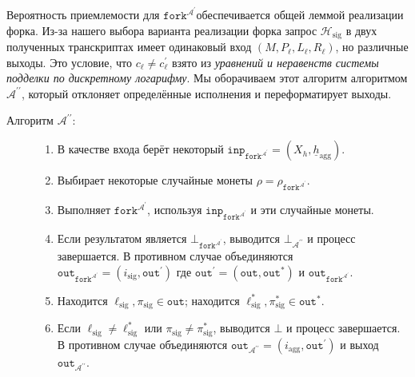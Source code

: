 \documentclass{mrl}
\theoremstyle{definition}
\numberwithin{theorem}{subsection}
\newcommand{\adversary}{\mathcal{A}}
\begin{document}
Вероятность приемлемости для $\texttt{fork}^{\adversary^\prime}$обеспечивается общей леммой реализации форка. Из-за нашего выбора варианта реализации форка запрос $\mathcal{H}_{\text{sig}}$ в двух полученных транскриптах имеет одинаковый вход $(M, P_\ell, L_\ell, R_\ell)$, но различные выходы. Это условие, что $c_\ell \neq c_\ell^{\prime}$ взято из \textit{уравнений и неравенств системы подделки по дискретному логарифму}. Мы оборачиваем этот алгоритм алгоритмом $\adversary^{\prime \prime}$, который отклоняет определённые исполнения и переформатирует выходы.

\begin{description}
\item [Алгоритм $\adversary^{\prime \prime}$:]

\begin{enumerate}
\item В качестве входа берёт некоторый $\texttt{inp}_{\texttt{fork}^{\adversary^\prime}} = (X_h, \underline{h}_{\text{agg}})$.

\item Выбирает некоторые случайные монеты $\rho = \rho_{\texttt{fork}^{\adversary^\prime}}$.

\item Выполняет $\texttt{fork}^{\adversary^\prime}$, используя $\texttt{inp}_{\texttt{fork}^{\adversary^\prime}}$ и эти случайные монеты.

\item Если результатом является $\bot_{\texttt{fork}^{\adversary^\prime}}$, выводится $\bot_{\adversary^{\prime \prime}}$ и процесс завершается. В противном случае объединяются $\texttt{out}_{\texttt{fork}^{\adversary^\prime}} = (i_{\text{sig}}, \texttt{out}^{\prime})$ где $\texttt{out}^{\prime} = (\texttt{out}, \texttt{out}^*)$ и $\texttt{out}_{\texttt{fork}^{\adversary^\prime}}$.

\item Находится $\ell_{\text{sig}}, \pi_{\text{sig}} \in \texttt{out}$; находится $\ell_{\text{sig}}^*, \pi^*_{\text{sig}} \in \texttt{out}^*$.

\item Если $\ell_{\text{sig}} \neq \ell_{\text{sig}}^*$ или $\pi_{\text{sig}} \neq \pi_{\text{sig}}^*$, выводится $\bot$ и процесс завершается. В противном случае объединяются $\texttt{out}_{\adversary^{\prime \prime}} = (i_{\text{agg}}, \texttt{out}^{\prime})$ и выход $\texttt{out}_{\adversary^{\prime\prime}}$.
\end{enumerate}
\end{description}
\end{document}
